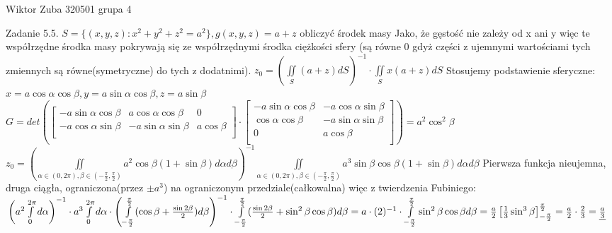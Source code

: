 \documentclass{article}
\begin{document}
Wiktor Zuba 320501 grupa 4
\newline

Zadanie 5.5.
\newline
\newline
$
S=\{(x,y,z):x^2+y^2+z^2=a^2\},g(x,y,z)=a+z
$
obliczyć środek masy\newline
Jako, że gęstość nie zależy od x ani y więc te współrzędne środka masy pokrywają się ze współrzędnymi środka ciężkości sfery
(są równe 0 gdyż części z ujemnymi wartościami tych zmiennych są równe(symetryczne) do tych z dodatnimi).\newline
$
z_0=\left(\iint\limits_{S}(a+z)dS\right)^{-1}\cdot\iint\limits_{S}x(a+z)dS
$\newline
Stosujemy podstawienie sferyczne:
$
x=a\cos{\alpha}\cos{\beta},y=a\sin{\alpha}\cos{\beta},z=a\sin{\beta}
$\newline
$
G=det\left(
\left[\begin{array}{ccc}
-a\sin{\alpha}\cos{\beta}&a\cos{\alpha}\cos{\beta}&0\\
-a\cos{\alpha}\sin{\beta}&-a\sin{\alpha}\sin{\beta}&a\cos{\beta}\\
\end{array}\right]
\cdot
\left[\begin{array}{cc}
-a\sin{\alpha}\cos{\beta}&-a\cos{\alpha}\sin{\beta}\\
\cos{\alpha}\cos{\beta}&-a\sin{\alpha}\sin{\beta}\\
0&a\cos{\beta}\\
\end{array}\right]
\right)
=
a^2\cos^2{\beta}
$\newline
$
z_0=\left(\iint\limits_{\alpha\in(0,2\pi),\beta\in(-\frac{\pi}{2},\frac{\pi}{2})}a^2\cos{\beta}(1+\sin{\beta})d\alpha d\beta\right)^{-1}
\iint\limits_{\alpha\in(0,2\pi),\beta\in(-\frac{\pi}{2},\frac{\pi}{2})}a^3\sin{\beta}\cos{\beta}(1+\sin{\beta})d\alpha d\beta
$\newline
Pierwsza funkcja nieujemna, druga ciągła, ograniczona(przez $\pm a^3$) na ograniczonym przedziale(całkowalna) więc z twierdzenia Fubiniego:
$\newline
\left(a^2\int\limits_{0}^{2\pi}d\alpha\right)^{-1}\cdot a^3\int\limits_{0}^{2\pi}d\alpha
\cdot\left(\int\limits_{-\frac{\pi}{2}}^{\frac{\pi}{2}}(\cos{\beta}+\frac{\sin{2\beta}}{2})d\beta\right)^{-1}\cdot\int\limits_{-\frac{\pi}{2}}^{\frac{\pi}{2}}(\frac{\sin{2\beta}}{2}+\sin^2{\beta}\cos{\beta})d\beta
=
a\cdot(2)^{-1}\cdot\int\limits_{-\frac{\pi}{2}}^{\frac{\pi}{2}}\sin^2{\beta}\cos{\beta}d\beta
=
\frac{a}{2}\left[\frac{1}{3}\sin^3{\beta}\right]_{-\frac{\pi}{2}}^{\frac{\pi}{2}}
=
\frac{a}{2}\cdot\frac{2}{3}
=
\underline{\frac{a}{3}}
$
\end{document}
